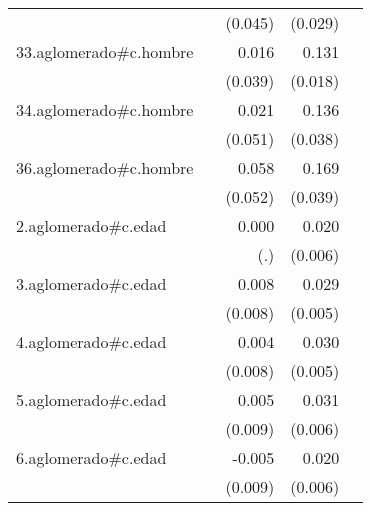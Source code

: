 {\begin{longtable}{l*{4}{D{.}{.}{-1}}}
            &                     &     (0.045)         &     (0.029)         &                     \\
\addlinespace
33.aglomerado#c.hombre&                     &       0.016         &       0.131\sym{***}&                     \\
            &                     &     (0.039)         &     (0.018)         &                     \\
\addlinespace
34.aglomerado#c.hombre&                     &       0.021         &       0.136\sym{***}&                     \\
            &                     &     (0.051)         &     (0.038)         &                     \\
\addlinespace
36.aglomerado#c.hombre&                     &       0.058         &       0.169\sym{***}&                     \\
            &                     &     (0.052)         &     (0.039)         &                     \\
\addlinespace
2.aglomerado#c.edad&                     &       0.000         &       0.020\sym{***}&                     \\
            &                     &         (.)         &     (0.006)         &                     \\
\addlinespace
3.aglomerado#c.edad&                     &       0.008         &       0.029\sym{***}&                     \\
            &                     &     (0.008)         &     (0.005)         &                     \\
\addlinespace
4.aglomerado#c.edad&                     &       0.004         &       0.030\sym{***}&                     \\
            &                     &     (0.008)         &     (0.005)         &                     \\
\addlinespace
5.aglomerado#c.edad&                     &       0.005         &       0.031\sym{***}&                     \\
            &                     &     (0.009)         &     (0.006)         &                     \\
\addlinespace
6.aglomerado#c.edad&                     &      -0.005         &       0.020\sym{***}&                     \\
            &                     &     (0.009)         &     (0.006)         &                     \\

\end{longtable}}
